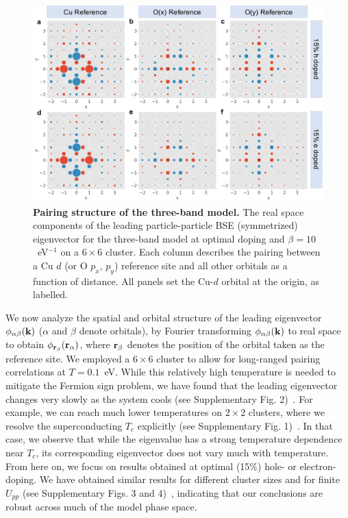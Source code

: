 \documentclass[fleqn,twocolumn,11pt]{wlscirep}
\begin{document}
\begin{figure}[ht]
\centering
\includegraphics[width=\linewidth]{./Figures/Figure2.pdf}
\caption{{\bf Pairing structure of the three-band model.} The real space components of the leading  particle-particle BSE  (symmetrized) eigenvector for the three-band model at optimal doping and $\beta=10$ ~eV$^{-1}$ on a $6\times6$ cluster. Each column describes the pairing between a Cu $d$ (or O $p_x$, $p_y$) reference site and all other orbitals as a function of distance. All panels set the Cu-$d$ orbital at the origin, as labelled.}
\label{Fig:DCAPairStructure}
\end{figure}

We now analyze the spatial and orbital structure of the leading eigenvector $\phi_{\alpha\beta}({\bf k})$ ($\alpha$ and $\beta$ denote orbitals), 
by Fourier transforming $\phi_{\alpha\beta}({\bf k})$ to real space to obtain $\phi_{{\bf r}_\beta}({\bf r}_{\alpha})$, where ${\bf r}_\beta$ denotes the position of the orbital taken as the reference site. We employed a $6\times6$ cluster to allow for long-ranged pairing correlations at $T=0.1$~eV. While this relatively high temperature is needed to mitigate the Fermion sign problem, we have found that the leading eigenvector changes very slowly as the system cools (see Supplementary Fig. 2)~\cite{supplement}. 
For example, we can reach much lower temperatures on $2\times2$ clusters, where we resolve the 
superconducting $T_c$ explicitly (see Supplementary Fig. 1)~\cite{supplement}. In that case, we observe that while the eigenvalue has a strong temperature dependence near $T_c$, its corresponding eigenvector does not vary much with temperature. From here on, we focus on results obtained at optimal (15\%) hole- or electron-doping. We have obtained similar results for different cluster sizes and for finite $U_{pp}$ (see Supplementary Figs. 3 and 4)~\cite{supplement}, indicating that our conclusions are robust across much of the model phase space. 
\end{document}
